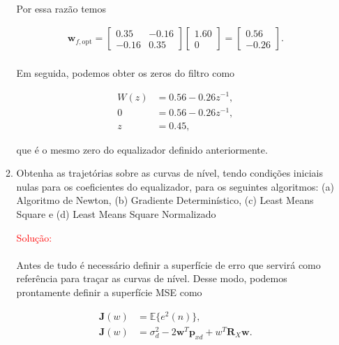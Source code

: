 \documentclass[a4paper,10pt]{article}
\begin{document}
\begin{enumerate}
\begin{enumerate}
						\paragraph{}Por essa razão temos

						\begin{align}
							\mathbf{w}_{f,\text{opt}} = 
							\begin{bmatrix}
								0.35 & -0.16 \\
								-0.16 & 0.35
							\end{bmatrix}
							\begin{bmatrix}
								1.60 \\
								0
							\end{bmatrix} =
							\begin{bmatrix}
								0.56 \\
								-0.26
							\end{bmatrix}.
						\end{align}

						\paragraph{}Em seguida, podemos obter os zeros do filtro como

						\begin{align}
							W(z) &= 0.56 - 0.26 z^{-1}, \\
							0 &= 0.56 - 0.26 z^{-1}, \\
							z &= 0.45,
						\end{align}

						que é o mesmo zero do equalizador definido anteriormente.

					\newpage
					\item Obtenha as trajetórias sobre as curvas de nível, tendo condições iniciais nulas para os coeﬁcientes do equalizador, para os seguintes algoritmos: (a) Algoritmo de Newton, (b) Gradiente Determinístico, (c) Least Means Square e (d) Least Means Square Normalizado
						
						\textcolor{red}{Solução:}
						
						\paragraph{}Antes de tudo é necessário definir a superfície de erro que servirá como referência para traçar as curvas de nível. Desse modo, podemos prontamente
						definir a superfície MSE como
						
						\begin{align}
							\mathbf{J}(w) &= \mathbb{E}\{e^{2}(n)\}, \\
							\mathbf{J}(w) &= \sigma^{2}_{d} - 2\mathbf{w}^{T}\mathbf{p}_{xd} + w^{T}\mathbf{R}_{X}\mathbf{w}. \label{mseopt}  
						\end{align}
						

\end{enumerate}
\end{enumerate}
\end{document}
